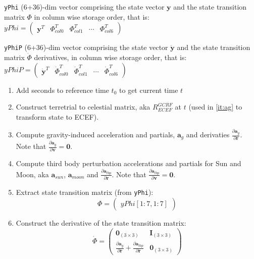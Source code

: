 \texttt{yPhi} (6+36)-dim vector comprising the state vector $\bm{y}$ and the
state transition matrix $\Phi$ in column wise storage order, that is:
$yPhi = \begin{pmatrix}
    \bm{y}^T &  \Phi ^T _{col0} & \Phi ^T _{col1} & \cdots & \Phi^T _{col6}
\end{pmatrix}$

\texttt{yPhiP} (6+36)-dim vector comprising the state vector 
$\dot{\bm{y}}$ and the state transition matrix $\dot{\Phi}$ derivatives, in 
column wise storage order, that is:
$yPhiP = \begin{pmatrix}
    \dot{\bm{y}}^T &  \dot{\Phi} ^T _{col0} & \dot{\Phi} ^T _{col1} & \cdots & \dot{\Phi} ^T _{col6}
\end{pmatrix}$

\begin{enumerate}
    \item Add seconds to reference time $t_0$ to get current time $t$
    
    \item Construct terretrial to celestial matrix, aka $R^{GCRF}_{ECEF}$ at 
        $t$ (used in \ref{it:ag} to transform state to ECEF).
    
    \item \label{it:ag} Compute gravity-induced acceleration and partials, 
        $\bm{a}_g$ and derivaties  
        $\frac{\partial \bm{a}_g}{\partial \bm{r}}$. Note that 
        $\frac{\partial \bm{a}_g}{\partial \bm{v}} = \bm{0}$.
    
    \item \label{it:atbp} Compute third body perturbation accelerations and 
        partials for Sun and Moon, aka $\bm{a}_{sun}$, $\bm{a}_{moon}$ and 
        $\frac{\partial \bm{a}_{tbp}}{\partial \bm{r}}$. Note that 
        $\frac{\partial \bm{a}_{tbp}}{\partial \bm{v}} = \bm{0}$.
    
    \item Extract state transition matrix (from \texttt{yPhi}):
        \begin{equation}
            \Phi = 
            \begin{pmatrix}
                yPhi[1:7, 1:7]
            \end{pmatrix}
        \end{equation}
    
    \item Construct the derivative of the state transition matrix:
        \begin{equation}
            \dot{\Phi} = 
            \begin{pmatrix}
                \bm{0}_{(3 \times 3)} & \bm{I}_{(3 \times 3)} \\
                \frac{\partial \bm{a}_g}{\partial \bm{r}} + 
                    \frac{\partial \bm{a}_{tbp}}{\partial \bm{r}} & \bm{0}_{(3 \times 3)}
            \end{pmatrix}
        \end{equation}
    

\end{enumerate}
